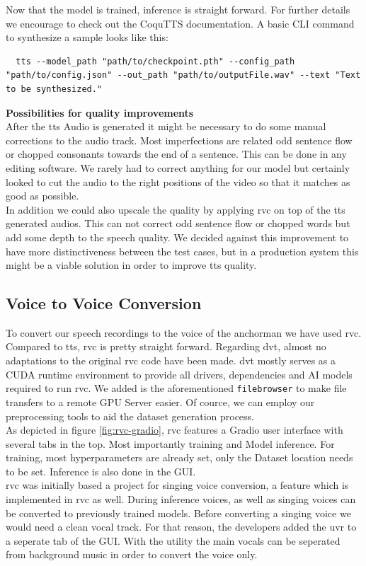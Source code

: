 \documentclass[
  a4paper,  %
  twoside,  %
  bibliography=totoc,
  headsepline,
  cleardoublepage=empty,
  parskip=half,
  draft=false
]{scrbook}
\begin{document}
Now that the model is trained, inference is straight forward. For further details we encourage to check out the CoquTTS documentation. A basic CLI command to synthesize a sample looks like this:
\begin{lstlisting}
  tts --model_path "path/to/checkpoint.pth" --config_path "path/to/config.json" --out_path "path/to/outputFile.wav" --text "Text to be synthesized."
\end{lstlisting}

\textbf{Possibilities for quality improvements} \\
After the \gls{tts} Audio is generated it might be necessary to do some manual corrections to the audio track. Most imperfections are related odd sentence flow or chopped consonants towards the end of a sentence. This can be done in any editing software. We rarely had to correct anything for our model but certainly looked to cut the audio to the right positions of the video so that it matches as good as possible. \\
In addition we could also upscale the quality by applying \gls{rvc} on top of the \gls{tts} generated audios. This can not correct odd sentence flow or chopped words but add some depth to the speech quality. We decided against this improvement to have more distinctiveness between the test cases, but in a production system this might be a viable solution in order to improve \gls{tts} quality. 

\subsection{Voice to Voice Conversion}
To convert our speech recordings to the voice of the anchorman we have used \gls{rvc}. Compared to \gls{tts}, \gls{rvc} is pretty straight forward. Regarding \gls*{dvt}, almost no adaptations to the original \gls*{rvc} \cite*{RVCProjectRetrievalbasedVoiceConversionWebUI2023} code have been made. \gls*{dvt} mostly serves as a CUDA runtime environment to provide all drivers, dependencies and AI models required to run \gls{rvc}. We added is the aforementioned \verb|filebrowser| to make file transfers to a remote GPU Server easier. Of cource, we can employ our preprocessing tools to aid the dataset generation process.\\
As depicted in figure \ref{fig:rvc-gradio}, \gls{rvc} features a Gradio user interface with several tabs in the top. Most importantly training and Model inference. For training, most hyperparameters are already set, only the Dataset location needs to be set. Inference is also done in the GUI. \\
\gls{rvc} was initially based a project for singing voice conversion, a feature which is implemented in \gls{rvc} as well. During inference voices, as well as singing voices can be converted to previously trained models. Before converting a singing voice we would need a clean vocal track. For that reason, the developers added the \gls{uvr} to a seperate tab of the GUI. With the utility the main vocals can be seperated from background music in order to convert the voice only.
\end{document}
